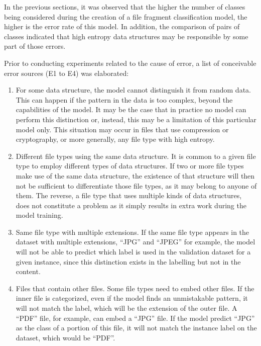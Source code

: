 \label{sec:exprandom}

In the previous sections, it was observed that the higher the number of classes being considered during the creation of a file fragment classification model, the higher is the error rate of this model. In addition, the comparison of pairs of classes indicated that high entropy data structures may be responsible by some part of those errors.

Prior to conducting experiments related to the cause of error, a list of conceivable error sources (E1 to E4) was elaborated:
\begin{enumerate}[itemindent=\parindent,label=\textbf{E\arabic*.}]
    \item For some data structure, the model cannot distinguish it from random data. This can happen if the pattern in the data is too complex, beyond the capabilities of the model. It may be the case that in practice no model can perform this distinction or, instead, this may be a limitation of this particular model only. This situation may occur in files that use compression or cryptography, or more generally, any file type with high entropy.

    \item Different file types using the same data structure. It is common to a given file type to employ different types of data structures. If two or more file types make use of the same data structure, the existence of that structure will then not be sufficient to differentiate those file types, as it may belong to anyone of them.
    The reverse, a file type that uses multiple kinds of data structures, does not constitute a problem as it simply results in extra work during the model training.

    \item Same file type with multiple extensions. If the same file type appears in the dataset with multiple extensions, ``JPG'' and ``JPEG'' for example, the model will not be able to predict which label is used in the validation dataset for a given instance, since this distinction exists in the labelling but not in the content.

    \item Files that contain other files. Some file types need to embed other files. If the inner file is categorized, even if the model finds an unmistakable pattern, it will not match the label, which will be the extension of the outer file. A ``PDF'' file, for example, can embed a ``JPG'' file. If the model predict ``JPG'' as the class of a portion of this file, it will not match the instance label on the dataset, which would be ``PDF''.
\end{enumerate}

